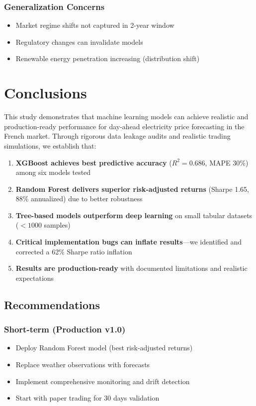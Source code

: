 \documentclass[11pt,a4paper]{article}
\begin{document}
\subsubsection{Generalization Concerns}
\begin{itemize}
    \item Market regime shifts not captured in 2-year window
    \item Regulatory changes can invalidate models
    \item Renewable energy penetration increasing (distribution shift)
\end{itemize}

\section{Conclusions}

This study demonstrates that machine learning models can achieve realistic and production-ready performance for day-ahead electricity price forecasting in the French market. Through rigorous data leakage audits and realistic trading simulations, we establish that:

\begin{enumerate}
    \item \textbf{XGBoost achieves best predictive accuracy} ($R^2 = 0.686$, MAPE 30\%) among six models tested

    \item \textbf{Random Forest delivers superior risk-adjusted returns} (Sharpe 1.65, 88\% annualized) due to better robustness

    \item \textbf{Tree-based models outperform deep learning} on small tabular datasets ($< 1000$ samples)

    \item \textbf{Critical implementation bugs can inflate results}—we identified and corrected a 62\% Sharpe ratio inflation

    \item \textbf{Results are production-ready} with documented limitations and realistic expectations
\end{enumerate}

\subsection{Recommendations}

\subsubsection{Short-term (Production v1.0)}
\begin{itemize}
    \item Deploy Random Forest model (best risk-adjusted returns)
    \item Replace weather observations with forecasts
    \item Implement comprehensive monitoring and drift detection
    \item Start with paper trading for 30 days validation
\end{itemize}
\end{document}
